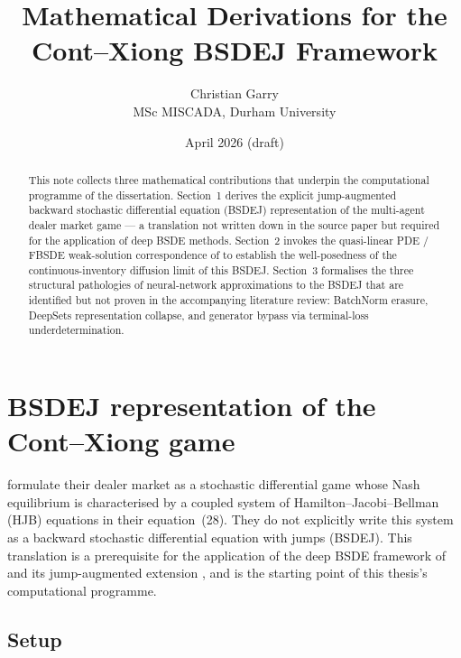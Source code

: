 \documentclass[11pt,a4paper]{article}
\title{\vspace{-2em}Mathematical Derivations for the Cont--Xiong BSDEJ Framework}
\author{Christian Garry \\ MSc MISCADA, Durham University}
\date{April 2026 (draft)}
\theoremstyle{definition}
\theoremstyle{remark}
\begin{document}
\maketitle
\vspace{-1em}

\begin{abstract}
\noindent
This note collects three mathematical contributions that underpin
the computational programme of the dissertation.  Section~1 derives
the explicit jump-augmented backward stochastic differential
equation (BSDEJ) representation of the \citet{cont2024} multi-agent
dealer market game --- a translation not written down in the
source paper but required for the application of deep BSDE methods.
Section~2 invokes the quasi-linear PDE / FBSDE weak-solution
correspondence of \citet{feng2018} to establish the
well-posedness of the continuous-inventory diffusion limit of
this BSDEJ.  Section~3 formalises the three structural
pathologies of neural-network approximations to the BSDEJ that
are identified but not proven in the accompanying literature
review: BatchNorm erasure, DeepSets representation collapse, and
generator bypass via terminal-loss underdetermination.
\end{abstract}

\section{BSDEJ representation of the Cont--Xiong game}
\label{sec:derivation}

\citet{cont2024} formulate their dealer market as a stochastic
differential game whose Nash equilibrium is characterised by a
coupled system of Hamilton--Jacobi--Bellman (HJB) equations in their
equation~(28).  They do not explicitly write this system as a
backward stochastic differential equation with jumps (BSDEJ).  This
translation is a prerequisite for the application of the deep BSDE
framework of \citet{han2018} and its jump-augmented extension
\citep{wang2023}, and is the starting point of this thesis's
computational programme.

\subsection{Setup}
\end{document}
